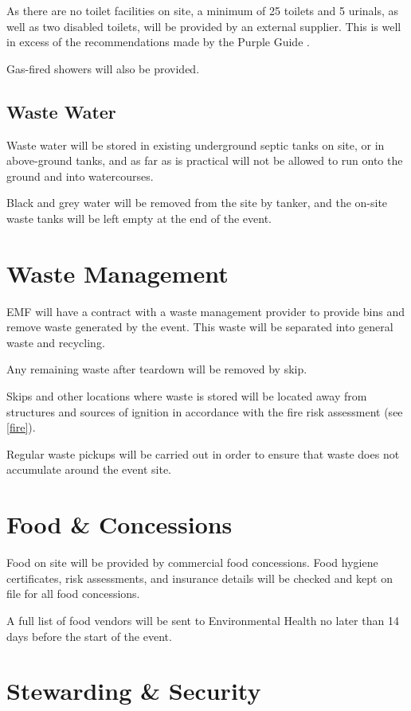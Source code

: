 As there are no toilet facilities on site, a minimum of 25 toilets and 5 urinals,
as well as two disabled toilets, will be provided by an external supplier. This
is well in excess of the recommendations made by the Purple Guide \cite{purpleguide}.

Gas-fired showers will also be provided.

\subsection{Waste Water}

Waste water will be stored in existing underground septic tanks on site, or in above-ground tanks,
and as far as is practical will not be allowed to run onto the ground and into watercourses.

Black and grey water will be removed from the site by tanker, and the on-site waste tanks
will be left empty at the end of the event.

\section{Waste Management}
EMF will have a contract with a waste management provider to provide bins and remove waste
generated by the event. This waste will be separated into general waste and recycling.

Any remaining waste after teardown will be removed by skip.

Skips and other locations where waste is stored will be located away from structures and
sources of ignition in accordance with the fire risk assessment (see \cref{fire}).

Regular waste pickups will be carried out in order to ensure that waste does not accumulate
around the event site.

\section{Food \& Concessions}\label{food}

Food on site will be provided by commercial food concessions. Food hygiene certificates,
risk assessments, and insurance details will be checked and kept on file for all food
concessions. 

A full list of food vendors will be sent to Environmental Health no later than 14 days before
the start of the event.

\section{Stewarding \& Security}

